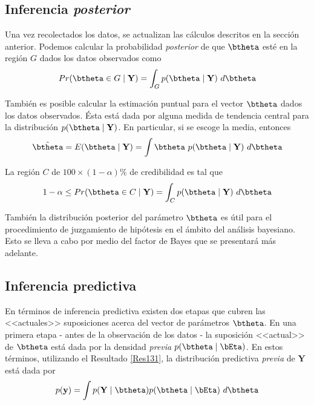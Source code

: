 \documentclass[10pt,openright]{book}\usepackage[]{graphicx}\usepackage[]{color}
\begin{document}
\subsection{Inferencia \emph{posterior}}
Una vez recolectados los datos, se actualizan las cálculos descritos en la sección anterior. Podemos calcular la probabilidad \emph{posterior} de que $\btheta$ esté en la región $G$ dados los datos observados como
\begin{equation}
Pr(\btheta\in G  \mid \mathbf{Y})=\int_G p(\btheta \mid \mathbf{Y})\ d\btheta
\end{equation}

También es posible calcular la estimación puntual para el vector $\btheta$ dados los datos observados. Ésta está dada por alguna medida de tendencia central para la distribución $p(\btheta \mid \mathbf{Y})$. En particular, si se escoge la media, entonces
\begin{equation}
\hat{\btheta}=E(\btheta \mid \mathbf{Y})=\int \btheta \ p(\btheta \mid \mathbf{Y})\ d\btheta
\end{equation}

La región $C$ de $100\times(1-\alpha)\%$ de credibilidad es tal que
\begin{equation}
1-\alpha \leq Pr(\btheta \in C \mid \mathbf{Y})=\int_Cp(\btheta \mid \mathbf{Y})\ d\btheta
\end{equation}

También la distribución posterior del parámetro $\btheta$ es útil para el procedimiento de juzgamiento de hipótesis en el ámbito del análisis bayesiano. Esto se lleva a cabo por medio del factor de Bayes que se presentará más adelante.

\subsection{Inferencia predictiva}

En términos de inferencia predictiva existen dos etapas que cubren las <<actuales>> suposiciones acerca del vector de parámetros $\btheta$. En una primera etapa - antes de la observación de los datos - la suposición <<actual>> de $\btheta$ está dada por la densidad  \emph{previa} $p(\btheta \mid \bEta)$. En estos términos, utilizando el Resultado \ref{Res131},  la distribución predictiva  \emph{previa} de $\mathbf{Y}$ está dada por
\begin{equation}
p(\mathbf{y})=\int p(\mathbf{Y} \mid \btheta)p(\btheta \mid \bEta)\ d\btheta
\end{equation}
\end{document}

